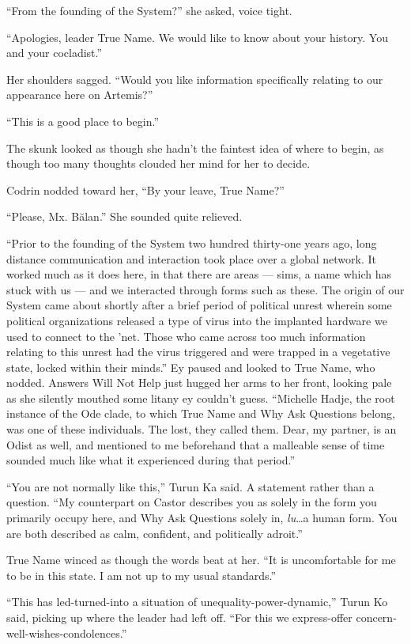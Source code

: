 ``From the founding of the System?'' she asked, voice tight.

``Apologies, leader True Name. We would like to know about your history. You and your cocladist.''

Her shoulders sagged. ``Would you like information specifically relating to our appearance here on Artemis?''

``This is a good place to begin.''

The skunk looked as though she hadn't the faintest idea of where to begin, as though too many thoughts clouded her mind for her to decide.

Codrin nodded toward her, ``By your leave, True Name?''

``Please, Mx. Bălan.'' She sounded quite relieved.

``Prior to the founding of the System two hundred thirty-one years ago, long distance communication and interaction took place over a global network. It worked much as it does here, in that there are areas — sims, a name which has stuck with us — and we interacted through forms such as these. The origin of our System came about shortly after a brief period of political unrest wherein some political organizations released a type of virus into the implanted hardware we used to connect to the 'net. Those who came across too much information relating to this unrest had the virus triggered and were trapped in a vegetative state, locked within their minds.'' Ey paused and looked to True Name, who nodded. Answers Will Not Help just hugged her arms to her front, looking pale as she silently mouthed some litany ey couldn't guess. ``Michelle Hadje, the root instance of the Ode clade, to which True Name and Why Ask Questions belong, was one of these individuals. The lost, they called them. Dear, my partner, is an Odist as well, and mentioned to me beforehand that a malleable sense of time sounded much like what it experienced during that period.''

``You are not normally like this,'' Turun Ka said. A statement rather than a question. ``My counterpart on Castor describes you as solely in the form you primarily occupy here, and Why Ask Questions solely in, \emph{lu}\ldots a human form. You are both described as calm, confident, and politically adroit.''

True Name winced as though the words beat at her. ``It is uncomfortable for me to be in this state. I am not up to my usual standards.''

``This has led-turned-into a situation of unequality-power-dynamic,'' Turun Ko said, picking up where the leader had left off. ``For this we express-offer concern-well-wishes-condolences.''

